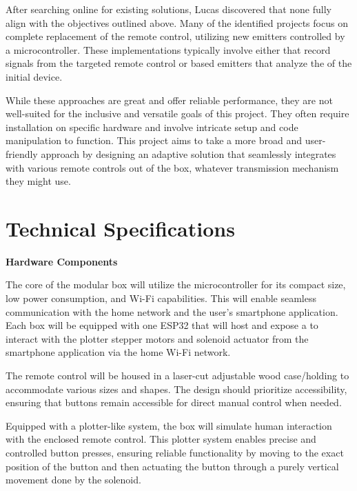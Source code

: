 After searching online for existing solutions, Lucas discovered that none fully align with the objectives outlined above.
Many of the identified projects focus on complete replacement of the remote control, utilizing new emitters controlled by a microcontroller.
These implementations typically involve either  that record signals from the targeted remote control or  based emitters that analyze the  of the initial device.

While these approaches are great and offer reliable performance, they are not well-suited for the inclusive and versatile goals of this project.
They often require installation on specific hardware and involve intricate setup and code manipulation to function.
This project aims to take a more broad and user-friendly approach by designing an adaptive solution that seamlessly integrates with various remote controls out of the box, whatever transmission mechanism they might use.

\section{Technical Specifications}

\textbf{Hardware Components}

The core of the modular box will utilize the  microcontroller for its compact size, low power consumption, and Wi-Fi capabilities.
This will enable seamless communication with the home network and the user's smartphone application.
Each box will be equipped with one ESP32 that will host and expose a  to interact with the plotter stepper motors and solenoid actuator from the smartphone application via the home Wi-Fi network.

The remote control will be housed in a laser-cut adjustable wood case/holding to accommodate various sizes and shapes.
The design should prioritize accessibility, ensuring that buttons remain accessible for direct manual control when needed.

Equipped with a plotter-like system, the box will simulate human interaction with the enclosed remote control.
This plotter system enables precise and controlled button presses, ensuring reliable functionality by moving to the exact position of the button and then actuating the button through a purely vertical movement done by the solenoid.

